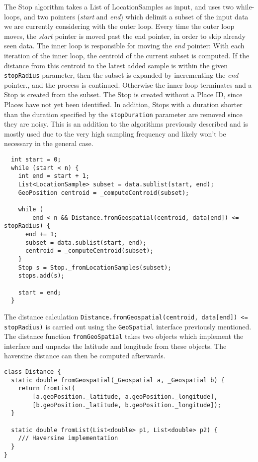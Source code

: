 The Stop algorithm takes a List of LocationSamples as input, and uses two while-loops, and two pointers (\textit{start} and \textit{end}) which delimit a subset of the input data we are currently considering with the outer loop. Every time the outer loop moves, the \textit{start} pointer is moved past the end pointer, in order to skip already seen data. The inner loop is responsible for moving the \textit{end} pointer: With each iteration of the inner loop, the centroid of the current subset is computed. If the distance from this centroid to the latest added sample is within the given \verb|stopRadius| parameter, then the subset is expanded by incrementing the \textit{end} pointer., and the process is continued. Otherwise the inner loop terminates and a Stop is created from the subset. The Stop is created without a Place ID, since Places have not yet been identified. In addition, Stops with a duration shorter than the duration specified by the \verb|stopDuration| parameter are removed since they are noisy. This is an addition to the algorithms previously described and is mostly used due to the very high sampling frequency and likely won't be necessary in the general case.

\begin{verbatim}
  int start = 0;
  while (start < n) {
    int end = start + 1;
    List<LocationSample> subset = data.sublist(start, end);
    GeoPosition centroid = _computeCentroid(subset);

    while (
        end < n && Distance.fromGeospatial(centroid, data[end]) <= stopRadius) {
      end += 1;
      subset = data.sublist(start, end);
      centroid = _computeCentroid(subset);
    }
    Stop s = Stop._fromLocationSamples(subset);
    stops.add(s);

    start = end;
  }
\end{verbatim}

The distance calculation \verb|Distance.fromGeospatial(centroid, data[end]) <= stopRadius)| is carried out using the \verb|GeoSpatial| interface previously mentioned. The distance function \verb|fromGeoSpatial| takes two objects which implement the interface and unpacks the latitude and longitude from these objects. The haversine distance can then be computed afterwards.

\begin{verbatim}
class Distance {
  static double fromGeospatial(_Geospatial a, _Geospatial b) {
    return fromList(
        [a.geoPosition._latitude, a.geoPosition._longitude],
        [b.geoPosition._latitude, b.geoPosition._longitude]);
  }

  static double fromList(List<double> p1, List<double> p2) {
    /// Haversine implementation
  }
}
\end{verbatim}

